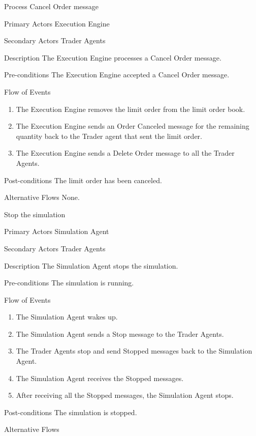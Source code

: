 \begin{usecase}{Process Cancel Order message}
\item[Primary Actors] Execution Engine
\item[Secondary Actors] Trader Agents
\item[Description] The Execution Engine processes a Cancel Order message.
\item[Pre-conditions] The Execution Engine accepted a Cancel Order message. 
\item[Flow of Events] 
\begin{enumerate}
\item The Execution Engine removes the limit order from the limit order book.
\item The Execution Engine sends an Order Canceled message for the remaining quantity back to the Trader agent that sent the limit order.
\item The Execution Engine sends a Delete Order message to all the Trader Agents.
\end{enumerate}
\item[Post-conditions] The limit order has been canceled.
\item[Alternative Flows] None.
\end{usecase}

\begin{usecase}{Stop the simulation}
\item[Primary Actors] Simulation Agent
\item[Secondary Actors] Trader Agents
\item[Description] The Simulation Agent stops the simulation.
\item[Pre-conditions] The simulation is running. 
\item[Flow of Events] 
\begin{enumerate}
\item The Simulation Agent wakes up.
\item The Simulation Agent sends a Stop message to the Trader Agents.
\item The Trader Agents stop and send Stopped messages back to the Simulation Agent.
\item The Simulation Agent receives the Stopped messages.
\item After receiving all the Stopped messages, the Simulation Agent stops.
\end{enumerate}
\item[Post-conditions] The simulation is stopped.
\item[Alternative Flows] 
\end{usecase}
